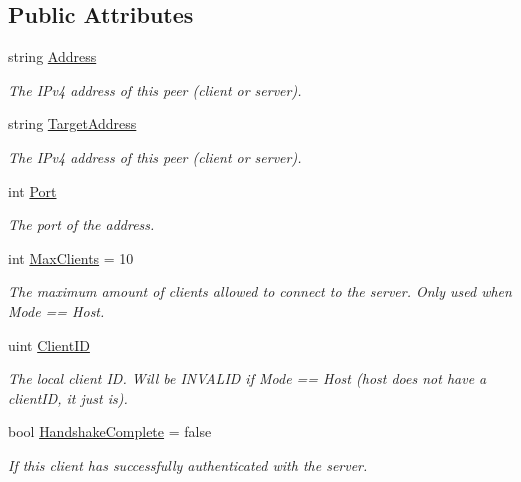 \subsection*{Public Attributes}
\begin{DoxyCompactItemize}
\item 
string \hyperlink{class_skyrates_1_1_common_1_1_network_1_1_session_ac6ecaf40c7cae0c6c7d6e8de1b2a892c}{Address}
\begin{DoxyCompactList}\small\item\em The I\-Pv4 address of this peer (client or server). \end{DoxyCompactList}\item 
string \hyperlink{class_skyrates_1_1_common_1_1_network_1_1_session_a6d550a6d31777ca6d1d6dfba00c7955b}{Target\-Address}
\begin{DoxyCompactList}\small\item\em The I\-Pv4 address of this peer (client or server). \end{DoxyCompactList}\item 
int \hyperlink{class_skyrates_1_1_common_1_1_network_1_1_session_aed90ad75336095fa3287c961aba40c7b}{Port}
\begin{DoxyCompactList}\small\item\em The port of the address. \end{DoxyCompactList}\item 
int \hyperlink{class_skyrates_1_1_common_1_1_network_1_1_session_a4d9934f0f98f603daf947afacf49d3fb}{Max\-Clients} = 10
\begin{DoxyCompactList}\small\item\em The maximum amount of clients allowed to connect to the server. Only used when Mode == Host. \end{DoxyCompactList}\item 
uint \hyperlink{class_skyrates_1_1_common_1_1_network_1_1_session_aac06adc8a6108e66ce1c465f60d9f95e}{Client\-I\-D}
\begin{DoxyCompactList}\small\item\em The local client I\-D. Will be I\-N\-V\-A\-L\-I\-D if Mode == Host (host does not have a client\-I\-D, it just is). \end{DoxyCompactList}\item 
bool \hyperlink{class_skyrates_1_1_common_1_1_network_1_1_session_aa819705fe7a825f718a25cf932471a47}{Handshake\-Complete} = false
\begin{DoxyCompactList}\small\item\em If this client has successfully authenticated with the server. \end{DoxyCompactList}\end{DoxyCompactItemize}


